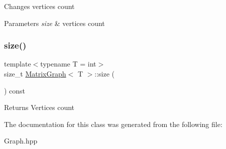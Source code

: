 Changes vertices count 
\begin{DoxyParams}{Parameters}
{\em size} & vertices count \\
\hline
\end{DoxyParams}
\mbox{\label{class_matrix_graph_acb1c06541182d4bb472c9813942a75b0}} 
\subsubsection{\texorpdfstring{size()}{size()}}
{\footnotesize\ttfamily template$<$typename T = int$>$ \\
size\+\_\+t \hyperlink{class_matrix_graph}{Matrix\+Graph}$<$ T $>$\+::size (\begin{DoxyParamCaption}{ }\end{DoxyParamCaption}) const\hspace{0.3cm}{\ttfamily [inline]}}

\begin{DoxyReturn}{Returns}
Vertices count 
\end{DoxyReturn}


The documentation for this class was generated from the following file\+:\begin{DoxyCompactItemize}
\item 
Graph.\+hpp\end{DoxyCompactItemize}
